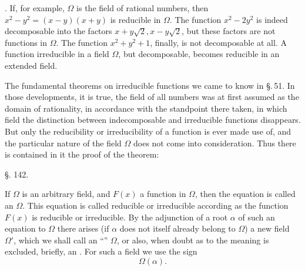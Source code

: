 
. If, for example, $\Omega$ is the field of rational numbers, then $x^2 - y^2 = (x - y)(x + y)$ is reducible in $\Omega$. The function $x^2 - 2y^2$ is indeed decomposable into the factors $x + y\sqrt{2}, x - y\sqrt{2}$, but these factors are not functions in $\Omega$. The function $x^2 + y^2 + 1$, finally, is not decomposable at all. A function irreducible in a field $\Omega$, but decomposable, becomes reducible in an extended field.

The fundamental theorems on irreducible functions we came to know in \S.\,51. In those developments, it is true, the field of all numbers was at first assumed as the domain of rationality, in accordance with the standpoint there taken, in which field the distinction between indecomposable and irreducible functions disappears. But only the reducibility or irreducibility of a function is ever made use of, and the particular nature of the field $\Omega$ does not come into consideration. Thus there is contained in it the proof of the theorem:


\begin{center}
§. 142.\\
\end{center}

If $\Omega$ is an arbitrary field, and $F(x)$ a function in $\Omega$, then the equation
is called an  $\Omega$. This equation is called reducible or irreducible according as the function $F(x)$ is reducible or irreducible. By the adjunction of a root $\alpha$ of such an equation to $\Omega$ there arises (if $\alpha$ does not itself already belong to $\Omega$) a new field $\Omega'$, which we shall call an  ``'' $\Omega$, or also, when doubt as to the meaning is excluded, briefly, an . For such a field we use the sign
\[ \Omega(\alpha). \]
